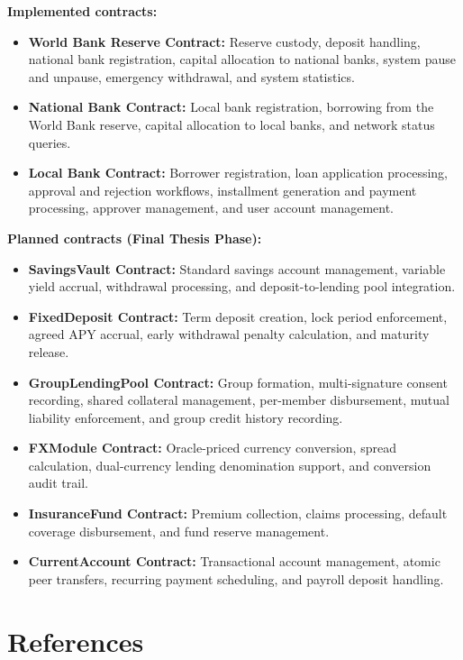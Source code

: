 \documentclass[12pt,a4paper]{report}
\begin{document}
\textbf{Implemented contracts:}
\begin{itemize}[noitemsep]
\item \textbf{World Bank Reserve Contract:} Reserve custody, deposit handling, national bank registration, capital allocation to national banks, system pause and unpause, emergency withdrawal, and system statistics.
\item \textbf{National Bank Contract:} Local bank registration, borrowing from the World Bank reserve, capital allocation to local banks, and network status queries.
\item \textbf{Local Bank Contract:} Borrower registration, loan application processing, approval and rejection workflows, installment generation and payment processing, approver management, and user account management.
\end{itemize}

\textbf{Planned contracts (Final Thesis Phase):}
\begin{itemize}[noitemsep]
\item \textbf{SavingsVault Contract:} Standard savings account management, variable yield accrual, withdrawal processing, and deposit-to-lending pool integration.
\item \textbf{FixedDeposit Contract:} Term deposit creation, lock period enforcement, agreed APY accrual, early withdrawal penalty calculation, and maturity release.
\item \textbf{GroupLendingPool Contract:} Group formation, multi-signature consent recording, shared collateral management, per-member disbursement, mutual liability enforcement, and group credit history recording.
\item \textbf{FXModule Contract:} Oracle-priced currency conversion, spread calculation, dual-currency lending denomination support, and conversion audit trail.
\item \textbf{InsuranceFund Contract:} Premium collection, claims processing, default coverage disbursement, and fund reserve management.
\item \textbf{CurrentAccount Contract:} Transactional account management, atomic peer transfers, recurring payment scheduling, and payroll deposit handling.
\end{itemize}


\chapter*{References}
\end{document}
